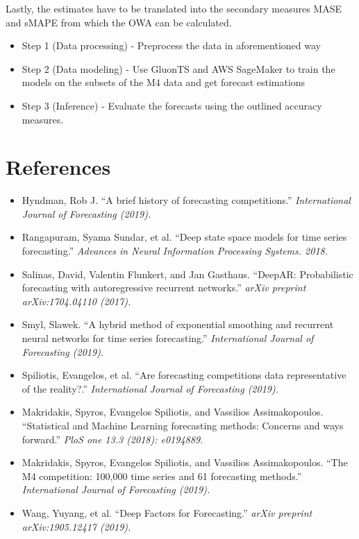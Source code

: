 \documentclass[11pt]{article}
\providecommand{\tightlist}{%
      \setlength{\itemsep}{0pt}\setlength{\parskip}{0pt}}
\begin{document}
Lastly, the estimates have to be translated into the secondary measures
MASE and sMAPE from which the OWA can be calculated.

\begin{itemize}
\tightlist
\item
  Step 1 (Data processing) - Preprocess the data in aforementioned way
\item
  Step 2 (Data modeling) - Use GluonTS and AWS SageMaker to train the
  models on the subsets of the M4 data and get forecast estimations
\item
  Step 3 (Inference) - Evaluate the forecasts using the outlined
  accuracy measures.
\end{itemize}

    \hypertarget{references}{%
\section{References}\label{references}}

\begin{itemize}
\tightlist
\item
  Hyndman, Rob J. ``A brief history of forecasting competitions.''
  \emph{International Journal of Forecasting (2019).}
\item
  Rangapuram, Syama Sundar, et al. ``Deep state space models for time
  series forecasting.'' \emph{Advances in Neural Information Processing
  Systems. 2018.}
\item
  Salinas, David, Valentin Flunkert, and Jan Gasthaus. ``DeepAR:
  Probabilistic forecasting with autoregressive recurrent networks.''
  \emph{arXiv preprint arXiv:1704.04110 (2017).}
\item
  Smyl, Slawek. ``A hybrid method of exponential smoothing and recurrent
  neural networks for time series forecasting.'' \emph{International
  Journal of Forecasting (2019).}
\item
  Spiliotis, Evangelos, et al. ``Are forecasting competitions data
  representative of the reality?.'' \emph{International Journal of
  Forecasting (2019).}
\item
  Makridakis, Spyros, Evangelos Spiliotis, and Vassilios Assimakopoulos.
  ``Statistical and Machine Learning forecasting methods: Concerns and
  ways forward.'' \emph{PloS one 13.3 (2018): e0194889.}
\item
  Makridakis, Spyros, Evangelos Spiliotis, and Vassilios Assimakopoulos.
  ``The M4 competition: 100,000 time series and 61 forecasting
  methods.'' \emph{International Journal of Forecasting (2019).}
\item
  Wang, Yuyang, et al. ``Deep Factors for Forecasting.'' \emph{arXiv
  preprint arXiv:1905.12417 (2019).}
\end{itemize}


    
    
    
    
\end{document}
